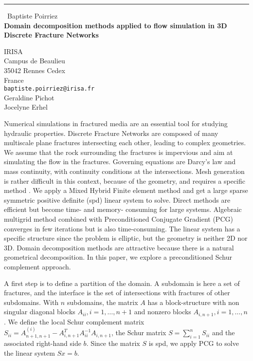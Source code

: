 \documentclass{report}
\begin{document}
\begin{center}
\rule{6in}{1pt} \
{\large Baptiste Poirriez \\
{\bf Domain decomposition methods applied to flow simulation in 3D Discrete Fracture Networks}}

IRISA \\ Campus de Beaulieu \\ 35042 Rennes Cedex \\ France
\\
{\tt baptiste.poirriez@irisa.fr}\\
Geraldine Pichot\\
Jocelyne Erhel\end{center}

Numerical simulations in fractured media are an essential tool for
studying hydraulic properties. Discrete Fracture Networks are composed of
many multiscale plane fractures intersecting each other, leading to
complex geometries. We assume that the rock surrounding the fractures is
impervious and aim at simulating the flow in the fractures. Governing
equations are Darcy's law and mass continuity, with continuity conditions
at the intersections. Mesh generation is rather difficult in this
context, because of the geometry, and requires a specific method
\cite{erhe09b}. We apply a Mixed Hybrid Finite element method and get a
large sparse symmetric positive definite (spd) linear system to solve.
Direct methods are efficient but become time- and memory- consuming for
large systems. Algebraic multigrid method combined with Preconditioned
Conjugate Gradient (PCG) converges in few iterations but is also
time-consuming. The linear system has a specific structure since the
problem is elliptic, but the geometry is neither 2D nor 3D. Domain
decomposition methods are attractive because there is a natural
geometrical decomposition. In this paper, we explore a preconditioned
Schur complement approach.

A first step is to define a partition of the domain. A subdomain is here
a set of fractures, and the interface is the set of intersections with
fractures of other subdomains. With $n$ subdomains, the matrix $A$ has a
block-structure with non singular diagonal blocks $A_{ii},i=1,\ldots,n+1$
and nonzero blocks $A_{i,n+1},i=1,\ldots,n$. We define the local Schur
complement matrix $S_{ii}=A_{n+1,n+1}^{(i)}-A_{i,n+1}^T A_{ii}^{-1}
A_{i,n+1}$, the Schur matrix $S=\sum_{i=1}^{n} S_{ii}$ and the associated
right-hand side $b$. Since the matrix $S$ is spd, we apply PCG to solve
the linear system $Sx=b$.
\end{document}
